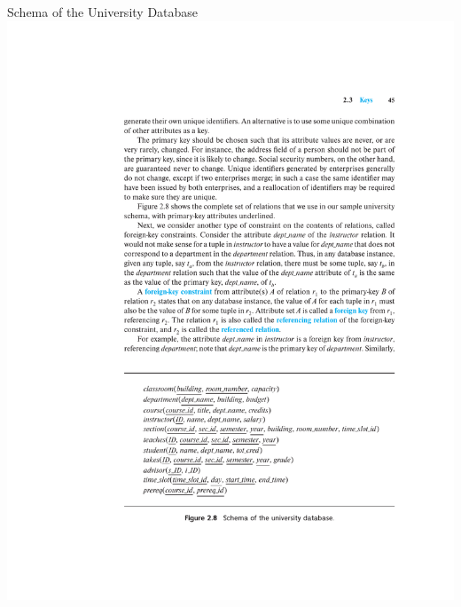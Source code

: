 \documentclass{beamer}
\begin{document}
\begin{frame}{Schema of the University Database}
    \centering
    \includegraphics[width=\textwidth, trim={5.50cm 4.50cm 2.90cm 16.50cm}, clip]{figures/db_schema_prime}
\end{frame}
\end{document}
